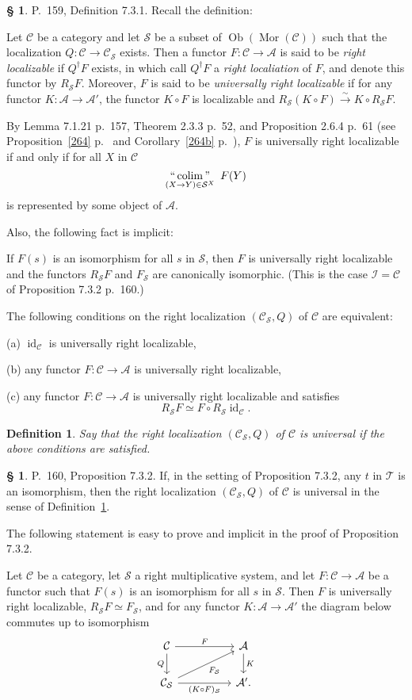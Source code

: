 \documentclass[12pt]{article}
\newtheorem{df}[thm]{Definition}%
\theoremstyle{remark}
\theoremstyle{definition}
\newtheorem{s}[thm]{\S}
\newcommand{\cc}{\mathcal}
\newcommand{\A}{\mathcal A}
\newcommand{\C}{\mathcal C}
\newcommand{\SSS}{\mathcal S}
\newcommand{\xr}{\xrightarrow}
\DeclareMathOperator*{\coli}{colim}
\DeclareMathOperator*{\icolim}{``\coli"}
\DeclareMathOperator{\id}{id}
\DeclareMathOperator{\Mor}{Mor}
\DeclareMathOperator{\Ob}{Ob}
\begin{document}
%
%
\begin{s} 
P.~159, Definition 7.3.1. Recall the definition: 

Let $\C$ be a category and let $\cc S$ be a subset of $\Ob(\Mor(\C))$ such that the localization $Q:\C\to\C_{\cc S}$ exists. Then a functor $F:\C\to\A$ is said to be {\em right localizable} if $Q^\dagger F$ exists, in which call $Q^\dagger F$ a {\em right localiation} of $F$, and denote this functor by $R_{\cc S}F$. Moreover, $F$ is said to be {\em universally right localizable} if for any functor $K:\A\to\A'$, the functor $K\circ F$ is localizable and $R_{\cc S}(K\circ F)\xr\sim K\circ R_{\cc S}F$.

By Lemma 7.1.21 p.~157, Theorem 2.3.3 p.~52, and Proposition 2.6.4 p.~61 (see Proposition~\ref{264} p.~\pageref{264} and Corollary~\ref{264b} p.~\pageref{264b}), $F$ is universally right localizable if and only if for all $X$ in $\C$ 
$$
\icolim_{(X\to Y)\in\SSS^X}\ F(Y) 
$$
is represented by some object of $\A$. 

Also, the following fact is implicit:

If $F(s)$ is an isomorphism for all $s$ in $\cc S$, then $F$ is universally right localizable and the functors $R_{\cc S}F$ and $F_{\cc S}$ are canonically isomorphic. (This is the case $\cc I=\C$ of Proposition 7.3.2 p.~160.)

The following conditions on the right localization $(\C_{\cc S},Q)$ of $\C$ are equivalent: 

\noindent(a) $\id_\C$ is universally right localizable, 

\noindent(b) any functor $F:\C\to\A$ is universally right localizable, 

\noindent(c) any functor $F:\C\to\A$ is universally right localizable and satisfies 
$$
R_{\cc S}F\simeq F\circ R_{\cc S}\id_\C.
$$
%
\begin{df}\label{url}
Say that the right localization $(\C_{\cc S},Q)$ of $\C$ is {\em universal} if the above conditions are satisfied.
\end{df}
\end{s}
%
%
\begin{s}\label{732} 
P.~160, Proposition 7.3.2. If, in the setting of Proposition 7.3.2, any $t$ in $\cc T$ is an isomorphism, then the right localization $(\C_{\cc S},Q)$ of $\C$ is universal in the sense of Definition~\ref{url}.

The following statement is easy to prove and implicit in the proof of Proposition 7.3.2. 

Let $\C$ be a category, let $\SSS$ a right multiplicative system, and let $F:\C\to\A$ be a functor such that $F(s)$ is an isomorphism for all $s$ in $\SSS$. Then $F$ is universally right localizable, $R_{\SSS}F\simeq F_{\SSS}$, and for any functor $K:\A\to\A'$ the diagram below commutes up to isomorphism
$$
\begin{tikzcd}
\C\ar{rr}{F}\ar{d}[swap]{Q}&&\A\ar{d}{K}\\
\C_{\SSS}\ar{rr}[swap]{(K\circ F)_{\SSS}}\ar{rru}[swap]{F_{\SSS}}&&\A'.
\end{tikzcd}
$$
\end{s}
%
%
\end{document}
